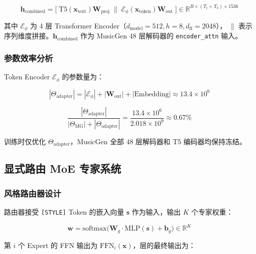 \documentclass[UTF8,12pt,a4paper]{ctexart}
\begin{document}
\begin{equation}
\mathbf{h}_{\text{combined}} = \big[\;\text{T5}(\mathbf{x}_{\text{text}})\mathbf{W}_{\text{proj}}\;\|\;
\mathcal{E}_{\phi}(\mathbf{x}_{\text{token}})\mathbf{W}_{\text{out}}\;\big]
\in \mathbb{R}^{B\times (T_t+T_k)\times 1536}
\end{equation}

其中 $\mathcal{E}_{\phi}$ 为 4 层 Transformer Encoder（$d_{\text{model}}=512, h=8, d_{\text{ff}}=2048$），
$\|$ 表示序列维度拼接。$\mathbf{h}_{\text{combined}}$ 作为 MusicGen 48 层解码器的 \texttt{encoder\_attn} 输入。

\subsubsection{参数效率分析}

Token Encoder $\mathcal{E}_{\phi}$ 的参数量为：

\begin{equation}
|\Theta_{\text{adapter}}| = |\mathcal{E}_{\phi}| + |\mathbf{W}_{\text{out}}| + |\text{Embedding}| \approx 13.4\times 10^6
\end{equation}

\begin{equation}
\frac{|\Theta_{\text{adapter}}|}{|\Theta_{\text{MG}}| + |\Theta_{\text{adapter}}|}
= \frac{13.4\times 10^6}{2.018\times 10^9} \approx 0.67\%
\end{equation}

训练时仅优化 $\Theta_{\text{adapter}}$，MusicGen 全部 48 层解码器和 T5 编码器均保持冻结。

\subsection{显式路由 MoE 专家系统}

\subsubsection{风格路由器设计}

路由器接受 \texttt{[STYLE]} Token 的嵌入向量 $\mathbf{s}$ 作为输入，输出 $K$ 个专家权重：

\begin{equation}
\mathbf{w} = \text{softmax}\big(\mathbf{W}_g \cdot \text{MLP}(\mathbf{s}) + \mathbf{b}_g\big) \in \mathbb{R}^{K}
\end{equation}

第 $i$ 个 Expert 的 FFN 输出为 $\text{FFN}_i(\mathbf{x})$，层的最终输出为：
\end{document}
